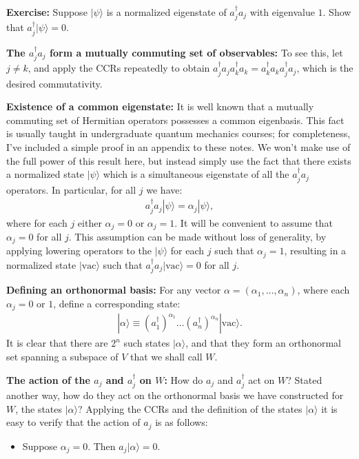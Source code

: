 \documentclass[12pt]{article}
\begin{document}
{\textbf{Exercise:} Suppose $|\psi\rangle$ is a normalized eigenstate
of $a_j^\dagger a_j$ with eigenvalue $1$.  Show that $a_j^\dagger
|\psi\rangle = 0$.

\textbf{The $a_j^\dagger a_j$ form a mutually commuting set of
  observables:} To see this, let $j \neq k$, and apply the CCRs
repeatedly to obtain $a_j^\dagger a_j a_k^\dagger a_k = a_k^\dagger
a_k a_j^\dagger a_j$, which is the desired commutativity.

\textbf{Existence of a common eigenstate:} It is well known that a
mutually commuting set of Hermitian operators possesses a common
eigenbasis.  This fact is usually taught in undergraduate quantum
mechanics courses; for completeness, I've included a simple proof in
an appendix to these notes.  We won't make use of the full power of
this result here, but instead simply use the fact that there exists a
normalized state $|\psi\rangle$ which is a simultaneous eigenstate of
all the $a_j^\dagger a_j$ operators.  In particular, for all $j$ we
have:
\begin{eqnarray}
  a_j^\dagger a_j |\psi\rangle = \alpha_j |\psi\rangle,
\end{eqnarray}
where for each $j$ either $\alpha_j = 0$ or $\alpha_j = 1$.  It will
be convenient to assume that $\alpha_j = 0$ for all $j$.  This
assumption can be made without loss of generality, by applying
lowering operators to the $|\psi\rangle$ for each $j$ such that
$\alpha_j = 1$, resulting in a normalized state $|\mbox{vac}\rangle$
such that $a_j^\dagger a_j |\mbox{vac}\rangle = 0$ for all $j$.

\textbf{Defining an orthonormal basis:} For any vector $\alpha =
(\alpha_1,\ldots,\alpha_n)$, where each $\alpha_j = 0$ or $1$, define
a corresponding state:
\begin{eqnarray}
  |\alpha \rangle \equiv (a_1^\dagger)^{\alpha_1} \ldots (a_n^\dagger)^{\alpha_n}|\mbox{vac}\rangle.
\end{eqnarray}
It is clear that there are $2^n$ such states $|\alpha\rangle$, and
that they form an orthonormal set spanning a subspace of $V$ that we
shall call $W$.

\textbf{The action of the $a_j$ and $a_j^\dagger$ on $W$:} How do
$a_j$ and $a_j^\dagger$ act on $W$?  Stated another way, how do they
act on the orthonormal basis we have constructed for $W$, the states
$|\alpha\rangle$?  Applying the CCRs and the definition of the states
$|\alpha\rangle$ it is easy to verify that the action of $a_j$ is as
follows:
\begin{itemize}
\item Suppose $\alpha_j = 0$.  Then $a_j|\alpha\rangle = 0$.
  

\end{itemize}}
\end{document}
